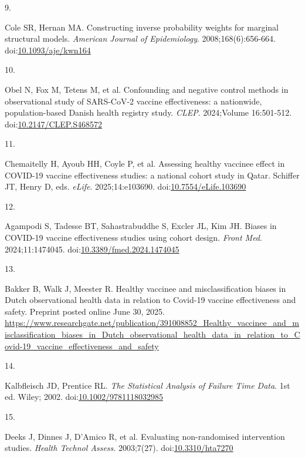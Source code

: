 \documentclass[
]{article}
\newlength{\cslhangindent}
\newlength{\csllabelwidth}
\newenvironment{CSLReferences}[2] %
 {\begin{list}{}{%
  \setlength{\itemindent}{0pt}
  \setlength{\leftmargin}{0pt}
  \setlength{\parsep}{0pt}
  \ifodd #1
   \setlength{\leftmargin}{\cslhangindent}
   \setlength{\itemindent}{-1\cslhangindent}
  \fi
  \setlength{\itemsep}{#2\baselineskip}}}
 {\end{list}}
\newcommand{\CSLLeftMargin}[1]{\parbox[t]{\csllabelwidth}{\strut#1\strut}}
\newcommand{\CSLRightInline}[1]{\parbox[t]{\linewidth - \csllabelwidth}{\strut#1\strut}}
\begin{document}
\begin{CSLReferences}{0}{1}
\CSLLeftMargin{9. }%
\CSLRightInline{Cole SR, Hernan MA. Constructing inverse probability
weights for marginal structural models. \emph{American Journal of
Epidemiology}. 2008;168(6):656-664.
doi:\href{https://doi.org/10.1093/aje/kwn164}{10.1093/aje/kwn164}}

\CSLLeftMargin{10. }%
\CSLRightInline{Obel N, Fox M, Tetens M, et al. Confounding and negative
control methods in observational study of SARS-CoV-2 vaccine
effectiveness: a nationwide, population-based Danish health registry
study. \emph{CLEP}. 2024;Volume 16:501-512.
doi:\href{https://doi.org/10.2147/CLEP.S468572}{10.2147/CLEP.S468572}}

\CSLLeftMargin{11. }%
\CSLRightInline{Chemaitelly H, Ayoub HH, Coyle P, et al. Assessing
healthy vaccinee effect in COVID-19 vaccine effectiveness studies: a
national cohort study in Qatar. Schiffer JT, Henry D, eds. \emph{eLife}.
2025;14:e103690.
doi:\href{https://doi.org/10.7554/eLife.103690}{10.7554/eLife.103690}}

\CSLLeftMargin{12. }%
\CSLRightInline{Agampodi S, Tadesse BT, Sahastrabuddhe S, Excler JL, Kim
JH. Biases in COVID-19 vaccine effectiveness studies using cohort
design. \emph{Front Med}. 2024;11:1474045.
doi:\href{https://doi.org/10.3389/fmed.2024.1474045}{10.3389/fmed.2024.1474045}}

\CSLLeftMargin{13. }%
\CSLRightInline{Bakker B, Walk J, Meester R. Healthy vaccinee and
misclassification biases in Dutch observational health data in relation
to Covid-19 vaccine effectiveness and safety. Preprint posted online
June 30, 2025.
\url{https://www.researchgate.net/publication/391008852_Healthy_vaccinee_and_misclassification_biases_in_Dutch_observational_health_data_in_relation_to_Covid-19_vaccine_effectiveness_and_safety}}

\CSLLeftMargin{14. }%
\CSLRightInline{Kalbfleisch JD, Prentice RL. \emph{The Statistical
Analysis of Failure Time Data}. 1st ed. Wiley; 2002.
doi:\href{https://doi.org/10.1002/9781118032985}{10.1002/9781118032985}}

\CSLLeftMargin{15. }%
\CSLRightInline{Deeks J, Dinnes J, D'Amico R, et al. Evaluating
non-randomised intervention studies. \emph{Health Technol Assess}.
2003;7(27). doi:\href{https://doi.org/10.3310/hta7270}{10.3310/hta7270}}


\end{CSLReferences}
\end{document}
